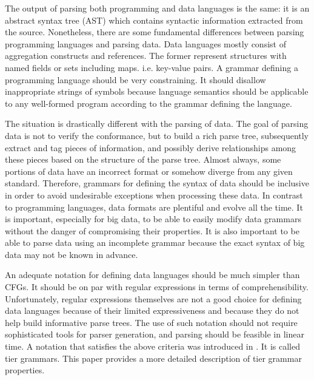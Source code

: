 \documentclass{llncs}
\begin{document}
The output of parsing both programming and data languages is the same: it is an abstract syntax tree (AST) \cite{Aho06} which contains syntactic information extracted from the source. Nonetheless, there are some fundamental differences between parsing programming languages and parsing data. Data languages mostly consist of aggregation constructs and references. The former represent structures with named fields or sets including maps. i.e. key-value pairs. A grammar defining a programming language should be very constraining. It should disallow inappropriate strings of symbols because language semantics should be applicable to any well-formed program according to the grammar defining the language. 

The situation is drastically different with the parsing of data. The goal of parsing data is not to verify the conformance, but to build a rich parse tree, subsequently extract and tag pieces of information, and possibly derive relationships among these pieces based on the structure of the parse tree. Almost always, some portions of data have an incorrect format or somehow diverge from any given standard. Therefore, grammars for defining the syntax of data should be inclusive in order to avoid undesirable exceptions when processing these data. In contrast to programming languages, data formats are plentiful and evolve all the time. It is important, especially for big data, to be able to easily modify data grammars without the danger of compromising their properties. It is also important to be able to parse data using an incomplete grammar because the exact syntax of big data may not be known in advance.

An adequate notation for defining data languages should be much simpler than CFGs. It should be on par with regular expressions in terms of comprehensibility. Unfortunately, regular expressions themselves are not a good choice for defining data languages because of their limited expressiveness and because they do not help build informative parse trees. The use of such notation should not require sophisticated tools for parser generation, and parsing should be feasible in linear time. A notation that satisfies the above criteria was introduced in \cite{Sakharov15}. It is called tier grammars. This paper provides a more detailed description of tier grammar properties. 
\end{document}
